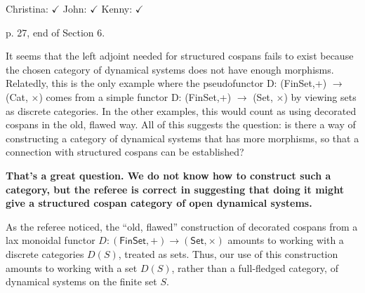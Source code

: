 \documentclass[reqno]{amsart}
\def\chris{\color{purple} Christina: }
\def\john{\color{red} John: }
\def\kenny{\color{blue} Kenny: }
\begin{document}
\begin{enumerate}
{{\chris $\checkmark$} {\john $\checkmark$} {\kenny  $\checkmark$}





\iffalse
{\kenny I \emph{think} they are complaining that we use $f$ as a map of vertices and $g$ as a map of edges when we're talking about the functor $F \colon \mathsf{Set} \to \mathsf{Cat}$ on page 21, but we use $g$ as a map of vertices and $f$ as a map of edges in the two squares at the start of Section 6.1 on the previous page?}

{\john That sounds plausible.  Unless there's a damn good reason let's use $f$ as a map for vertices and $g$ as a map for edges, since ``vertices come 
before edges'' - morally the first are 0-cells, the second are 1-cells.}

{\chris I see. Fixed, and see above.}
\fi

\item p. 27, end of Section 6.

It seems that the left adjoint needed for structured cospans fails to exist because the chosen category of dynamical systems does not have enough 
morphisms. Relatedly, this is the only example where the pseudofunctor D: (FinSet,+) $\to$ (Cat, $\times$) comes from a simple functor D: (FinSet,+) 
$\to$ (Set, $\times$) by viewing sets as discrete categories. In the other examples, this would count as using decorated cospans in the old, flawed 
way. 
All of this suggests the question: is there a way of constructing a category of dynamical systems that has more morphisms, so that a connection with 
structured cospans can be established?

{\bf That's a great question.   We do not know how to construct such a category, but the referee
is correct in suggesting that doing it might give a structured cospan category of open dynamical
systems.    

As the referee noticed, the ``old, flawed'' construction of 
decorated cospans from a lax monoidal functor $D \colon (\mathsf{FinSet},+) \to 
(\mathsf{Set}, \times) $ amounts to working with a discrete categories $D(S)$, treated
as sets.  Thus, our use of this construction amounts to working with a
set $D(S)$, rather than a full-fledged category, of dynamical systems on the finite set $S$.

}}
\end{enumerate}
\end{document}
